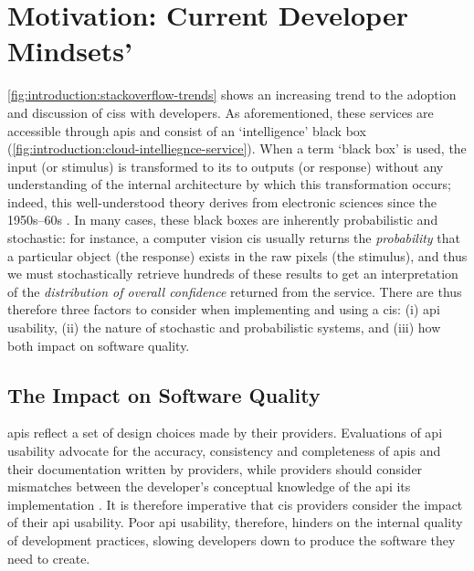 \section{Motivation: Current Developer Mindsets'}
\label{sec:introduction:motivation}

\cref{fig:introduction:stackoverflow-trends} shows an increasing trend to the adoption and discussion of \glspl{cis} with developers. As aforementioned, these services are accessible through \glspl{api} and consist of an `intelligence' black box (\cref{fig:introduction:cloud-intelliegnce-service}). When a term `black box' is used, the input (or stimulus) is transformed to its to outputs (or response) without any understanding of the internal architecture by which this transformation occurs; indeed, this well-understood theory derives from electronic sciences since the 1950s--60s . In many cases, these black boxes are inherently probabilistic and stochastic: for instance, a computer vision \gls{cis} usually returns the \textit{probability} that a particular object (the response) exists in the raw pixels (the stimulus), and thus we must stochastically retrieve hundreds of these results to get an interpretation of the \textit{distribution of overall confidence} returned from the service. There are thus therefore three factors to consider when implementing and using a \gls{cis}: (i) \gls{api} usability, (ii) the nature of stochastic and probabilistic systems, and (iii) how both impact on software quality.

\subsection{The Impact on Software Quality}
\label{ssec:introduction:motivation:impact}

\glspl{api} reflect a set of design choices made by their providers. Evaluations of \gls{api} usability advocate for the accuracy, consistency and completeness of \glspl{api} and their documentation \citep{Piccioni:2013em,Robillard:2009uk} written by providers, while providers should consider mismatches between the developer's conceptual knowledge of the \gls{api} its implementation \citep{Ko:2011fb}. It is therefore imperative that \gls{cis} providers consider the impact of their \gls{api} usability. Poor \gls{api} usability, therefore, hinders on the internal quality of development practices, slowing developers down to produce the software they need to create.

